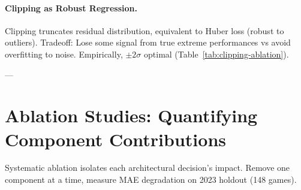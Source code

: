 \paragraph{Clipping as Robust Regression.}
Clipping truncates residual distribution, equivalent to Huber loss (robust to outliers). Tradeoff: Lose some signal from true extreme performances vs avoid overfitting to noise. Empirically, $\pm 2\sigma$ optimal (Table~\ref{tab:clipping-ablation}).

---

\section{Ablation Studies: Quantifying Component Contributions}
\label{sec:ablation}

Systematic ablation isolates each architectural decision's impact. Remove one component at a time, measure MAE degradation on 2023 holdout (148 games).

